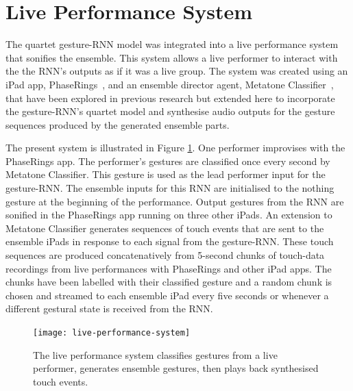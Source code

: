 \documentclass[sigchi]{acmart} %
\begin{document}
\section{Live Performance System}

The quartet gesture-RNN model was integrated into a live performance
system that sonifies the ensemble. This system allows a live performer
to interact with the the RNN's outputs as if it was a live group.
The system was created using an iPad app,
PhaseRings~\cite{Martin:2016ah}, and an ensemble director agent,
Metatone Classifier~\cite{Martin:2016xu}, that have been explored in
previous research but extended here to incorporate the gesture-RNN's
quartet model and synthesise audio outputs for the gesture sequences
produced by the generated ensemble parts.

The present system is illustrated in Figure
\ref{fig:live-performance-system}. One performer improvises with the
PhaseRings app. The performer's gestures are classified once every
second by Metatone Classifier. This gesture is used as the lead
performer input for the gesture-RNN. The ensemble inputs for this RNN
are initialised to the nothing gesture at the beginning of the
performance. Output gestures from the RNN are sonified in the
PhaseRings app running on three other iPads. An extension to Metatone
Classifier generates sequences of touch events that are sent to the
ensemble iPads in response to each signal from the gesture-RNN. These
touch sequences are produced concatenatively from 5-second chunks of
touch-data recordings from live performances with PhaseRings and other
iPad apps. The chunks have been labelled with their classified gesture
and a random chunk is chosen and streamed to each ensemble iPad every
five seconds or whenever a different gestural state is received from
the RNN.

\begin{figure}
  \centering
  \texttt{[image: live-performance-system]}
  \caption{The live performance system classifies gestures from a live
  performer, generates ensemble gestures, then plays back synthesised
  touch events.}\label{fig:live-performance-system}
\end{figure}
\end{document}
